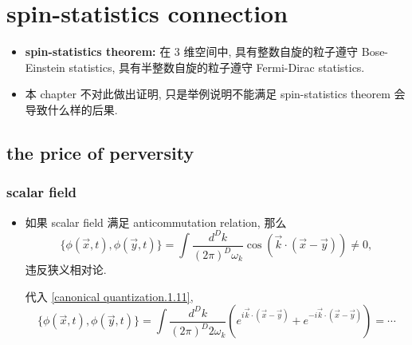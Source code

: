 \chapter{spin-statistics connection}
\begin{itemize}
	\item \textbf{spin-statistics theorem:} 在 3 维空间中, 具有整数自旋的粒子遵守 Bose-Einstein statistics, 具有半整数自旋的粒子遵守 Fermi-Dirac statistics.
	
	\item 本 chapter 不对此做出证明, 只是举例说明不能满足 spin-statistics theorem 会导致什么样的后果.
\end{itemize}

\section{the price of perversity}
\subsection{scalar field}
\begin{itemize}
	\item 如果 scalar field 满足 anticommutation relation, 那么
	\begin{equation}
		\{\phi(\vec{x}, t), \phi(\vec{y}, t)\} = \int \frac{d^D k}{(2 \pi)^D \omega_k} \cos(\vec{k} \cdot (\vec{x} - \vec{y})) \neq 0,
	\end{equation}
	违反狭义相对论.
	
	\begin{tcolorbox}[title=calculation:]
		代入 \eqref{canonical quantization.1.11},
		\begin{equation}
			\{\phi(\vec{x}, t), \phi(\vec{y}, t)\} = \int \frac{d^D k}{(2 \pi)^D 2 \omega_k} (e^{i \vec{k} \cdot (\vec{x} - \vec{y})} + e^{- i \vec{k} \cdot (\vec{x} - \vec{y})}) = \cdots
		\end{equation}
	\end{tcolorbox}
\end{itemize}

